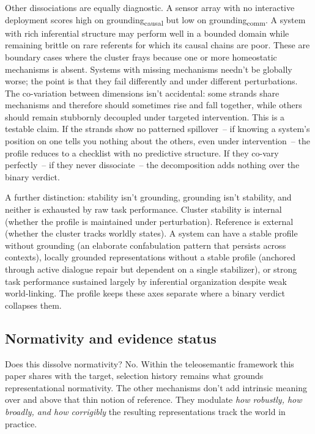 \documentclass[12pt]{article}
\newcommand{\gcausal}{grounding\textsubscript{causal}}
\newcommand{\gcomm}{grounding\textsubscript{comm}}
\begin{document}
Other dissociations are equally diagnostic. A sensor array with no interactive deployment scores high on \gcausal{} but low on \gcomm{}. A system with rich inferential structure may perform well in a bounded domain while remaining brittle on rare referents for which its causal chains are poor. These are boundary cases where the cluster frays because one or more homeostatic mechanisms is absent. Systems with missing mechanisms needn't be globally worse; the point is that they fail differently and under different perturbations. The co-variation between dimensions isn't accidental: some strands share mechanisms and therefore should sometimes rise and fall together, while others should remain stubbornly decoupled under targeted intervention. This is a testable claim. If the strands show no patterned spillover~-- if knowing a system's position on one tells you nothing about the others, even under intervention~-- the profile reduces to a checklist with no predictive structure. If they co-vary perfectly~-- if they never dissociate~-- the decomposition adds nothing over the binary verdict.

A further distinction: stability isn't grounding, grounding isn't stability, and neither is exhausted by raw task performance. Cluster stability is internal (whether the profile is maintained under perturbation). Reference is external (whether the cluster tracks worldly states). A system can have a stable profile without grounding (an elaborate confabulation pattern that persists across contexts), locally grounded representations without a stable profile (anchored through active dialogue repair but dependent on a single stabilizer), or strong task performance sustained largely by inferential organization despite weak world-linking. The profile keeps these axes separate where a binary verdict collapses them.

\subsection{Normativity and evidence status}
\label{sec:normativity-evidence}

Does this dissolve normativity? No. Within the teleosemantic framework this paper shares with the target, selection history remains what grounds representational normativity. The other mechanisms don't add intrinsic meaning over and above that thin notion of reference. They modulate \emph{how robustly, how broadly, and how corrigibly} the resulting representations track the world in practice.
\end{document}

